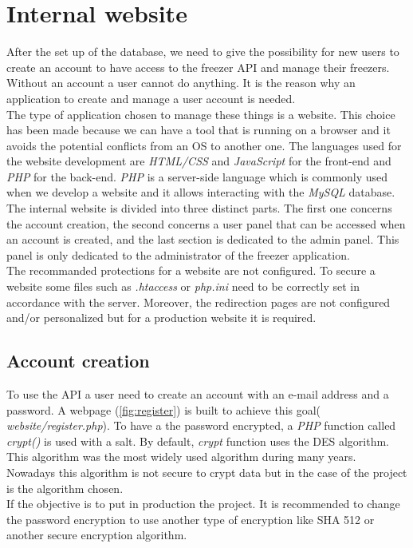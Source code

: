 \section{Internal website}
After the set up of the database, we need to give the possibility for new users to create an account to have access to the freezer API and manage their freezers. Without an account a user cannot do anything. It is the reason why an application to create and manage a user account is needed.\\

The type of application chosen to manage these things is a website. This choice has been made because we can have a tool that is running on a browser and it avoids the potential conflicts from an OS to another one. The languages used for the website development are \textit{HTML/CSS} and \textit{JavaScript} for the front-end and \textit{PHP} for the back-end. \textit{PHP} is a server-side language which is commonly used when we develop a website and it allows interacting with the \textit{MySQL} database. \\

The internal website is divided into three distinct parts. The first one concerns the account creation, the second concerns a user panel that can be accessed when an account is created, and the last section is dedicated to the admin panel. This panel is only dedicated to the administrator of the freezer application. \\

The recommanded protections for a website are not configured. To secure a website some files such as \textit{.htaccess} or \textit{php.ini} need to be correctly set in accordance with the server. Moreover, the redirection pages are not configured and/or personalized but for a production website it is required.

\subsection{Account creation}
To use the API a user need to create an account with an e-mail address and a password. A webpage (\autoref{fig:register}) is built to achieve this goal( \textit{website/register.php}). To have a the password encrypted, a \textit{PHP} function called \textit{crypt()} is used with a salt. By default, \textit{crypt} function uses the DES algorithm. This algorithm was the most widely used algorithm during many years. Nowadays this algorithm is not secure to crypt data but in the case of the project is the algorithm chosen.\\
If the objective is to put in production the project. It is recommended to change the password encryption to use another type of encryption like SHA 512 or another secure encryption algorithm.\\

